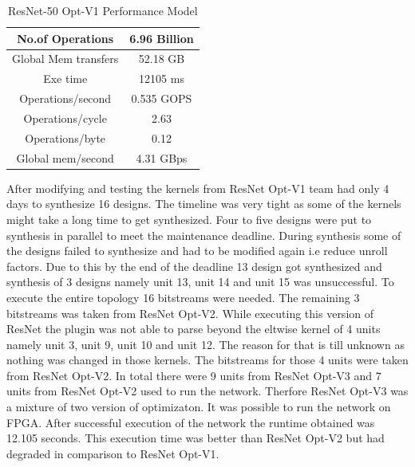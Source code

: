 \begin{table}[!htb]
\centering
\captionsetup{
justification = centering
}
\caption{ResNet-50 Opt-V1 Performance Model}
\label{tab:ResNet50OptV3PerformanceModel}
\begin{tabular}{|c|c|}
\hline
No.of Operations     & 6.96 Billion \\ \hline
Global Mem transfers & 52.18 GB     \\ \hline
Exe time             & 12105 ms     \\ \hline
Operations/second    & 0.535 GOPS   \\ \hline
Operations/cycle     & 2.63         \\ \hline
Operations/byte      & 0.12         \\ \hline
Global mem/second    & 4.31 GBps    \\ \hline
\end{tabular}
\end{table}
After modifying and testing the kernels from ResNet Opt-V1 team had only 4 days to synthesize 16 designs. The timeline was very tight as some of the kernels might take a long time to get synthesized. Four to five designs were put to synthesis in parallel to meet the maintenance deadline. During synthesis some of the designs failed to synthesize and had to be modified again i.e reduce unroll factors. Due to this by the end of the deadline 13 design got synthesized and synthesis of 3 designs namely unit 13, unit 14 and unit 15 was unsuccessful. 
\newline
To execute the entire topology 16 bitstreams were needed. The remaining 3 bitstreams was taken from ResNet Opt-V2. While executing this version of ResNet the plugin was not able to parse beyond the eltwise kernel of 4 units namely unit 3, unit 9, unit 10 and unit 12. The reason for that is till unknown as nothing was changed in those kernels. The bitstreams for those 4 units were taken from ResNet Opt-V2. In total there were 9 units from ResNet Opt-V3 and 7 units from ResNet Opt-V2 used to run the network. Therfore ResNet Opt-V3 was a mixture of two version of optimizaton. 
\newline
It was possible to run the network on FPGA. After successful execution of the network the runtime obtained was 12.105 seconds. This execution time was better than ResNet Opt-V2 but had degraded in comparison to ResNet Opt-V1. 

